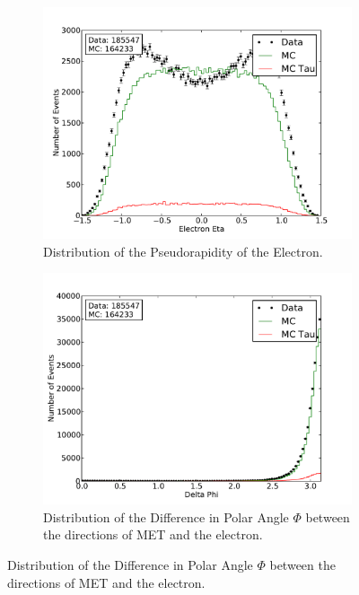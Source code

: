 \documentclass[
	paper=A4,
	parskip=full,
	chapterprefix=true,
	11pt,
	headings=normal,
	bibliography=totoc,
	listof=totoc,
	titlepage=on,
]{scrreprt}
\begin{document}
\begin{figure}%
	\centering
	\begin{subfigure}{0.45\textwidth}
		\includegraphics{nocuts/eta_el}
		\caption{Distribution of the Pseudorapidity of the Electron.}
	\end{subfigure}
	\begin{subfigure}{0.45\textwidth}
		\includegraphics{nocuts/delta_phi}
		\caption{Distribution of the Difference in Polar Angle $\Phi$ between the directions of MET and the electron.}
	\end{subfigure}
	\label{no_cuts_etaphi}
\end{figure}
\end{document}
